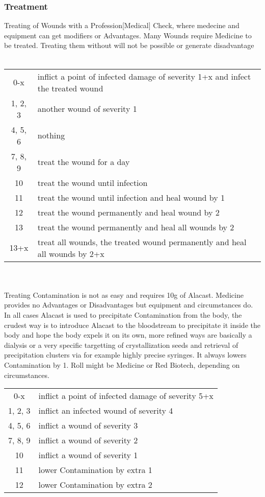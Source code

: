 \documentclass{article}
\begin{document}
    \subsubsection{Treatment}
    Treating of Wounds with a Profession[Medical] Check, where medecine and equipment can get modifiers or Advantages.
    Many Wounds require Medicine to be treated. Treating them without will not be possible or generate disadvantage\\\\
    \begin{tabular}{cl}
        0-x & inflict a point of infected damage of severity 1+x and infect the treated wound\\
        1, 2, 3 & another wound of severity 1\\
        4, 5, 6 & nothing\\
        7, 8, 9 & treat the wound for a day\\
        10 & treat the wound until infection \\
        11 & treat the wound until infection and heal wound by 1 \\
        12 & treat the wound permanently and heal wound by 2 \\
        13 & treat the wound permanently and heal all wounds by 2\\
        13+x & treat all wounds, the treated wound permanently and heal all wounds by 2+x\\
    \end{tabular}\\\\
    Treating Contamination is not as easy and requires 10g of Alacast. Medicine provides no Advantages or Disadvantages
    but equipment and circumstances do. In all cases Alacast is used to precipitate Contamination from the body, the
    crudest way is to introduce Alacast to the bloodstream to precipitate it inside the body and hope the body expels
    it on its own, more refined ways are basically a dialysis or a very specific targetting of crystallization seeds
    and retrieval of precipitation clusters via for example highly precise syringes. It always lowers Contamination by 1.
    Roll might be Medicine or Red Biotech, depending on circumstances.
        \begin{tabular}{cl}
        0-x & inflict a point of infected damage of severity 5+x \\
        1, 2, 3 & inflict an infected wound of severity 4 \\
        4, 5, 6 & inflict a wound of severity 3\\
        7, 8, 9 & inflict a wound of severity 2\\
        10 & inflict a wound of severity 1\\
        11 & lower Contamination by extra 1 \\
        12 & lower Contamination by extra 2 \\
    \end{tabular}\\\\
\end{document}
